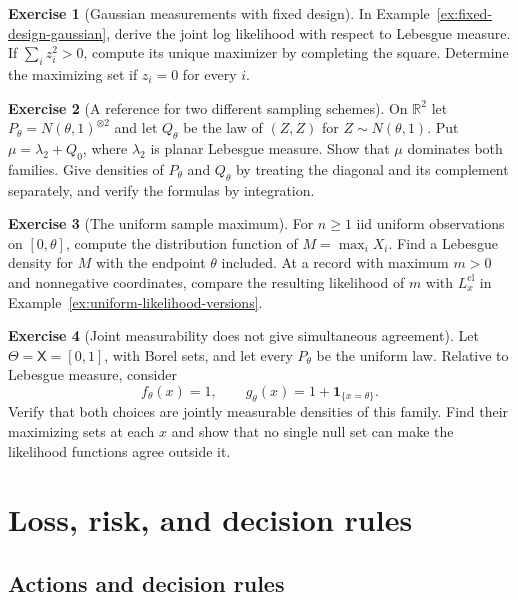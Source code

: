 \documentclass[11pt,oneside]{book}
\theoremstyle{definition}
\newtheorem{exercise}{Exercise}[section]
\theoremstyle{remark}
\newcommand{\R}{\mathbb R}
\begin{document}
\begin{exercise}[Gaussian measurements with fixed design]
\label{exer:gaussian-design-likelihood}
In Example~\ref{ex:fixed-design-gaussian}, derive the joint log likelihood
with respect to Lebesgue measure. If $\sum_i z_i^2>0$, compute its unique
maximizer by completing the square. Determine the maximizing set if
$z_i=0$ for every $i$.
\end{exercise}

\begin{exercise}[A reference for two different sampling schemes]
\label{exer:gaussian-diagonal-reference}
On $\R^2$ let $P_\theta=N(\theta,1)^{\otimes2}$ and let $Q_\theta$ be
the law of $(Z,Z)$ for $Z\sim N(\theta,1)$. Put $\mu=\lambda_2+Q_0$,
where $\lambda_2$ is planar Lebesgue measure. Show that $\mu$ dominates
both families. Give densities of $P_\theta$ and $Q_\theta$ by treating
the diagonal and its complement separately, and verify the formulas by
integration.
\end{exercise}

\begin{exercise}[The uniform sample maximum]
\label{exer:uniform-max-likelihood}
For $n\geq1$ iid uniform observations on $[0,\theta]$, compute the
distribution function of $M=\max_i X_i$. Find a Lebesgue density for
$M$ with the endpoint $\theta$ included. At a record with maximum $m>0$
and nonnegative coordinates, compare the resulting likelihood of $m$
with $L_x^{\mathrm{cl}}$ in Example~\ref{ex:uniform-likelihood-versions}.
\end{exercise}

\begin{exercise}[Joint measurability does not give simultaneous agreement]
\label{exer:diagonal-density-versions}
Let $\Theta=\mathsf X=[0,1]$, with Borel sets, and let every $P_\theta$
be the uniform law. Relative to Lebesgue measure, consider
\[
f_\theta(x)=1,\qquad g_\theta(x)=1+\mathbf 1_{\{x=\theta\}}.
\]
Verify that both choices are jointly measurable densities of this family.
Find their maximizing sets at each $x$ and show that no single null set
can make the likelihood functions agree outside it.
\end{exercise}

\chapter{Loss, risk, and decision rules}
\label{chap:statistical-decisions}
\section{Actions and decision rules}
\label{sec:actions-decision-rules}
\end{document}
